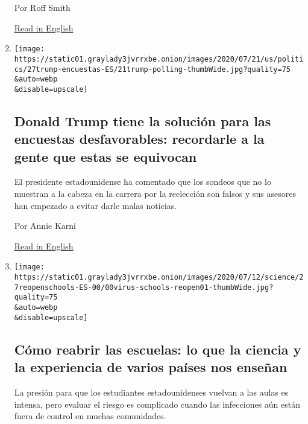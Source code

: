 \begin{enumerate}
  Por Roff Smith

  \href{https://www.nytimes3xbfgragh.onion/2020/07/20/travel/panama-hats-ecuador.html}{Read
  in English}
\item
  \href{/es/2020/07/27/espanol/estados-unidos/Trump-encuestas-elecciones.html}{}

  \texttt{[image: https://static01.graylady3jvrrxbe.onion/images/2020/07/21/us/politics/27trump-encuestas-ES/21trump-polling-thumbWide.jpg?quality=75\\\&auto=webp\\\&disable=upscale]}

  \hypertarget{donald-trump-tiene-la-soluciuxf3n-para-las-encuestas-desfavorables-recordarle-a-la--gente-que-estas-se-equivocan}{%
  \subsection{Donald Trump tiene la solución para las encuestas
  desfavorables: recordarle a la~ gente que estas se
  equivocan}\label{donald-trump-tiene-la-soluciuxf3n-para-las-encuestas-desfavorables-recordarle-a-la--gente-que-estas-se-equivocan}}

  El presidente estadounidense ha comentado que los sondeos que no lo
  muestran a la cabeza en la carrera por la reelección son falsos y sus
  asesores han empezado a evitar darle malas noticias.

  Por Annie Karni

  \href{https://www.nytimes3xbfgragh.onion/2020/07/22/us/politics/trump-polls-2020.html}{Read
  in English}
\item
  \href{/es/2020/07/27/espanol/ciencia-y-tecnologia/regreso-a-clases-coronavirus.html}{}

  \texttt{[image: https://static01.graylady3jvrrxbe.onion/images/2020/07/12/science/27reopenschools-ES-00/00virus-schools-reopen01-thumbWide.jpg?quality=75\\\&auto=webp\\\&disable=upscale]}

  \hypertarget{cuxf3mo-reabrir-las-escuelas-lo-que-la-ciencia-y-la-experiencia-de-varios-pauxedses-nos-enseuxf1an}{%
  \subsection{Cómo reabrir las escuelas: lo que la ciencia y la
  experiencia de varios países nos
  enseñan}\label{cuxf3mo-reabrir-las-escuelas-lo-que-la-ciencia-y-la-experiencia-de-varios-pauxedses-nos-enseuxf1an}}

  La presión para que los estudiantes estadounidenses vuelvan a las
  aulas es intensa, pero evaluar el riesgo es complicado cuando las
  infecciones aún están fuera de control en muchas comunidades.


\end{enumerate}
